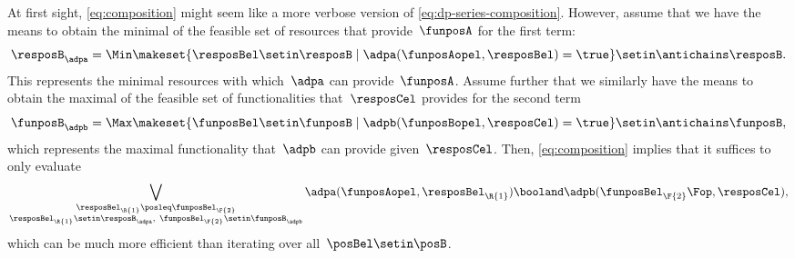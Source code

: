 At first sight, \cref{eq:composition} might seem like a more verbose version of \cref{eq:dp-series-composition}.
However, assume that we have the means to obtain the minimal  of the feasible set of resources that provide~$\funposA$ for the first term:
\begin{equation}
    \resposB_\adpa = \Min \makeset{\resposBel\setin \resposB \mid \adpa(\funposAopel,\resposBel)=\true} \setin \antichains \resposB.
\end{equation}
This represents the minimal resources with which~$\adpa$ can provide~$\funposA$.
Assume further that we similarly have the means to obtain the maximal  of the feasible set of functionalities that~$\resposCel$ provides for the second term
\begin{equation}
    \funposB_\adpb = \Max \makeset{\funposBel\setin \funposB \mid \adpb(\funposBopel,\resposCel)=\true} \setin \antichains \funposB,
\end{equation}
which represents the maximal functionality that~$\adpb$ can provide given~$\resposCel$.
Then, \cref{eq:composition} implies that it suffices to only evaluate
\begin{equation}
    \bigvee_{\substack{\resposBel_\R{1}\posleq\funposBel_\F{2} \\ \resposBel_\R{1}\setin \resposB_\adpa,~ \funposBel_\F{2}\setin\funposB_\adpb }} \adpa(\funposAopel,\resposBel_\R{1}) \booland \adpb(\funposBel_\F{2}\Fop,\resposCel),
\end{equation}
which can be much more efficient than iterating over all~$\posBel\setin \posB$.
